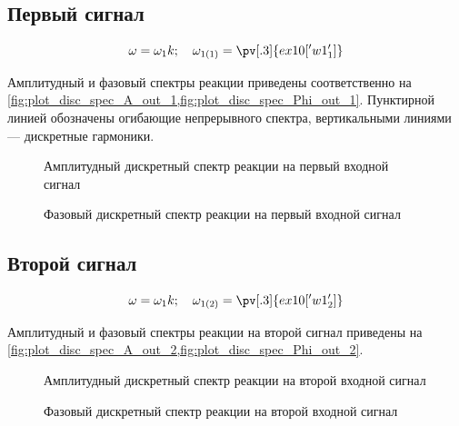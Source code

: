 \subsection{Первый сигнал}
\begin{equation}
    \omega = \omega_1 k; \quad \omega_{1(1)} = \pv[.3]{ex10['w1_1']}
\end{equation}

Амплитудный и фазовый спектры реакции приведены соответственно на \cref{fig:plot_disc_spec_A_out_1,fig:plot_disc_spec_Phi_out_1}. Пунктирной линией обозначены огибающие непрерывного спектра, вертикальными линиями — дискретные гармоники.

\begin{figure}[H]
    \centering
    
    \caption{Амплитудный дискретный спектр реакции на первый входной сигнал}
    \label{fig:plot_disc_spec_A_out_1}
\end{figure}

\begin{figure}[H]
    \centering
    
    \caption{Фазовый дискретный спектр реакции на первый входной сигнал}
    \label{fig:plot_disc_spec_Phi_out_1}
\end{figure}

\subsection{Второй сигнал}

\begin{equation}
    \omega = \omega_1 k; \quad \omega_{1(2)} = \pv[.3]{ex10['w1_2']}
\end{equation}

Амплитудный и фазовый спектры реакции на второй сигнал приведены на \cref{fig:plot_disc_spec_A_out_2,fig:plot_disc_spec_Phi_out_2}.

\begin{figure}[H]
    \centering
    
    \caption{Амплитудный дискретный спектр реакции на второй входной сигнал}
    \label{fig:plot_disc_spec_A_out_2}
\end{figure}

\begin{figure}[H]
    \centering
    
    \caption{Фазовый дискретный спектр реакции на второй входной сигнал}
    \label{fig:plot_disc_spec_Phi_out_2}
\end{figure}

